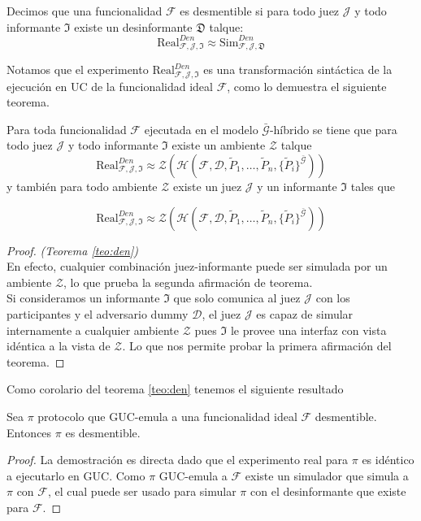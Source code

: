 \begin{definicion}[Desmentibilidad]
Decimos que una funcionalidad $\mathcal{F}$ es
desmentible si para todo juez $\mathcal{J}$ y todo informante
$\mathfrak{I}$ existe un desinformante $\mathfrak{D}$ talque:
$$\mathrm{Real}_{\mathcal{F}, \mathcal{J}, \mathfrak{I}}^{Den} \approx
\mathrm{Sim}_{\mathcal{F}, \mathcal{J}, \mathfrak{D}}^{Den}$$
\end{definicion}

Notamos que el experimento $\mathrm{Real}_{\mathcal{F}, \mathcal{J}, \mathfrak{I}}^{Den}$ es una transformación
sintáctica de la ejecución en UC de la funcionalidad ideal $\mathcal{F}$, como lo demuestra el siguiente teorema.

\begin{teorema}
Para toda funcionalidad $\mathcal{F}$ ejecutada en el modelo $\bar{\mathcal{G}}$-híbrido se tiene que para
todo juez $\mathcal{J}$ y todo informante $\mathfrak{I}$ existe un ambiente $\mathcal{Z}$ talque
$$\mathrm{Real}_{\mathcal{F}, \mathcal{J}, \mathfrak{I}}^{Den} \approx
\mathcal{Z}(\mathcal{H}(
        \mathcal{F},
        \mathcal{D},
        \tilde{P}_1,
        \ldots,
        \tilde{P}_n,
        \{\tilde{P}_i\}^{\bar{\mathcal{G}}}))
$$
y también para todo ambiente $\mathcal{Z}$ existe un juez $\mathcal{J}$ y un informante $\mathfrak{I}$
tales que

$$\mathrm{Real}_{\mathcal{F}, \mathcal{J}, \mathfrak{I}}^{Den} \approx
\mathcal{Z}(\mathcal{H}(
        \mathcal{F},
        \mathcal{D},
        \tilde{P}_1,
        \ldots,
        \tilde{P}_n,
        \{\tilde{P}_i\}^{\bar{\mathcal{G}}}))
$$

\label{teo:den}
\end{teorema}

\begin{proof}
\textit{(Teorema \ref{teo:den})}\\
En efecto, cualquier combinación juez-informante puede ser simulada por un ambiente $\mathcal{Z}$,
lo que prueba la segunda afirmación de teorema.\\
Si consideramos un informante $\mathfrak{I}$ que solo comunica al juez $\mathcal{J}$ con los participantes
y el adversario dummy $\mathcal{D}$, el juez $\mathcal{J}$ es capaz de simular internamente a cualquier
ambiente $\mathcal{Z}$
pues $\mathfrak{I}$ le provee una interfaz con vista idéntica a la vista de $\mathcal{Z}$. Lo que nos
permite probar la primera afirmación del teorema.
\end{proof}

Como corolario del teorema \ref{teo:den} tenemos el siguiente resultado
\begin{corolario}
Sea $\pi$ protocolo que GUC-emula a una funcionalidad
ideal $\mathcal{F}$ desmentible. Entonces $\pi$ es desmentible.
\label{cor:den}
\end{corolario}

\begin{proof}
La demostración es directa dado que el experimento real para $\pi$ es idéntico a ejecutarlo en GUC.
Como $\pi$ GUC-emula a $\mathcal{F}$ existe un simulador que simula a $\pi$ con $\mathcal{F}$, el cual
puede ser usado para simular $\pi$ con el desinformante que existe para $\mathcal{F}$.
\end{proof}

